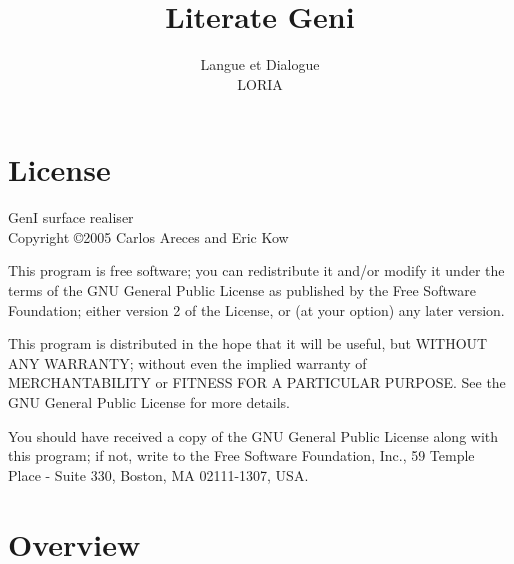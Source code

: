 \documentclass[a4paper,11pt]{report}
\begin{document}
\title{Literate Geni}
\author{Langue et Dialogue\\LORIA}

\maketitle
\tableofcontents


\chapter*{License}

GenI surface realiser\\
Copyright \copyright 2005 Carlos Areces and Eric Kow

\bigskip

This program is free software; you can redistribute it and/or
modify it under the terms of the GNU General Public License
as published by the Free Software Foundation; either version 2
of the License, or (at your option) any later version.

\bigskip

This program is distributed in the hope that it will be useful,
but WITHOUT ANY WARRANTY; without even the implied warranty of
MERCHANTABILITY or FITNESS FOR A PARTICULAR PURPOSE.  See the
GNU General Public License for more details.

\bigskip

You should have received a copy of the GNU General Public License
along with this program; if not, write to the Free Software
Foundation, Inc., 59 Temple Place - Suite 330, Boston, MA  02111-1307, USA.

\chapter{Overview}
\end{document}
